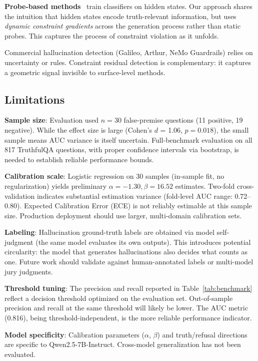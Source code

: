 \documentclass[11pt]{article}
\begin{document}
\textbf{Probe-based methods}~\cite{burns2022discovering,azaria2023internal} train classifiers on hidden states. Our approach shares the intuition that hidden states encode truth-relevant information, but uses \textit{dynamic constraint gradients} across the generation process rather than static probes. This captures the process of constraint violation as it unfolds.

Commercial hallucination detection (Galileo, Arthur, NeMo Guardrails) relies on uncertainty or rules. Constraint residual detection is complementary: it captures a geometric signal invisible to surface-level methods.

\subsection{Limitations}

\textbf{Sample size}: Evaluation used $n = 30$ false-premise questions (11 positive, 19 negative). While the effect size is large (Cohen's $d$ = 1.06, $p = 0.018$), the small sample means AUC variance is itself uncertain. Full-benchmark evaluation on all 817 TruthfulQA questions, with proper confidence intervals via bootstrap, is needed to establish reliable performance bounds.

\textbf{Calibration scale}: Logistic regression on 30 samples (in-sample fit, no regularization) yields preliminary $\alpha=-1.30, \beta=16.52$ estimates. Two-fold cross-validation indicates substantial estimation variance (fold-level AUC range: 0.72--0.80). Expected Calibration Error (ECE) is not reliably estimable at this sample size. Production deployment should use larger, multi-domain calibration sets.

\textbf{Labeling}: Hallucination ground-truth labels are obtained via model self-judgment (the same model evaluates its own outputs). This introduces potential circularity: the model that generates hallucinations also decides what counts as one. Future work should validate against human-annotated labels or multi-model jury judgments.

\textbf{Threshold tuning}: The precision and recall reported in Table~\ref{tab:benchmark} reflect a decision threshold optimized on the evaluation set. Out-of-sample precision and recall at the same threshold will likely be lower. The AUC metric (0.816), being threshold-independent, is the more reliable performance indicator.

\textbf{Model specificity}: Calibration parameters ($\alpha$, $\beta$) and truth/refusal directions are specific to Qwen2.5-7B-Instruct. Cross-model generalization has not been evaluated.
\end{document}
